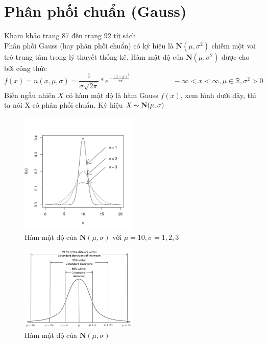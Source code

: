 \documentclass[a4paper, 13pt]{report}
\begin{document}
\section{Phân phối chuẩn (Gauss)}
Kham khảo trang 87 đến trang 92 từ sách \cite{TKCNUDR}\\
Phân phối Gauss (hay phân phối chuẩn) có ký hiệu là $\textbf{N}(\mu,\sigma^2)$ chiếm một vai trò trung tâm trong lý thuyết thống kê. Hàm mật độ của $\textbf{N}(\mu,\sigma^2)$ được cho bởi công thức
\[
f(x)=n(x,\mu,\sigma)=\frac{1}{\sigma\sqrt{2\pi}} * e^{-\frac{(x-\mu)^2}{2\sigma^2}} \qquad \qquad \qquad -\infty < x < \infty, \mu \in \mathbb{R}, \sigma^2 > 0
\]
Biến ngẫu nhiên $\mathit{X}$ có hàm mật độ là hàm Gauss $f(x)$, xem hình dưới đây, thì ta nói X có phân phối chuẩn. Ký hiệu $\mathit{X} \thicksim \textbf{N}(\mu,\sigma)$\\
\FloatBarrier
\begin{figure}[h]
  \centering
    \includegraphics[width=0.5\textwidth]{Normal_Distribution_PDF.png}    
    \caption{Hàm mật độ của $\textbf{N}(\mu,\sigma)$ với $\mu=10, \sigma=1,2,3$}
\end{figure}
\FloatBarrier
\FloatBarrier
\begin{figure}[h]
  \centering
    \includegraphics[width=0.5\textwidth]{Empirical_Rule.png}    
    \caption{Hàm mật độ của $\textbf{N}(\mu,\sigma)$}
\end{figure}
\FloatBarrier
\end{document}
